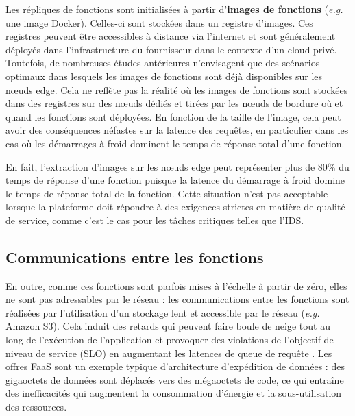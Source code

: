 Les répliques de fonctions sont initialisées à partir d'\textbf{images de fonctions} (\textit{e.g.} une image Docker). Celles-ci sont stockées dans un registre d'images. Ces registres peuvent être accessibles à distance via l'internet et sont généralement déployés dans l'infrastructure du fournisseur dans le contexte d'un cloud privé. Toutefois, de nombreuses études antérieures \cite{bhasiCypressInputSizesensitive2022, zijunFassflowEfficient2022, smithFaDOFaaSFunctions2022, zhangFIRSTExploitingMultiDimensional2023} n'envisagent que des scénarios optimaux dans lesquels les images de fonctions sont déjà disponibles sur les nœuds edge. Cela ne reflète pas la réalité où les images de fonctions sont stockées dans des registres sur des nœuds dédiés et tirées par les nœuds de bordure où et quand les fonctions sont déployées. En fonction de la taille de l'image, cela peut avoir des conséquences néfastes sur la latence des requêtes, en particulier dans les cas où les démarrages à froid dominent le temps de réponse total d'une fonction.

En fait, l'extraction d'images sur les nœuds edge peut représenter plus de 80\% du temps de réponse d'une fonction \cite{yanHermesEfficientCache2020} puisque la latence du démarrage à froid domine le temps de réponse total de la fonction. Cette situation n'est pas acceptable lorsque la plateforme doit répondre à des exigences strictes en matière de qualité de service, comme c'est le cas pour les tâches critiques telles que l'IDS.

\subsection{Communications entre les fonctions}
\label{section:herocache-background-communications}

En outre, comme ces fonctions sont parfois mises à l'échelle à partir de zéro, elles ne sont pas adressables par le réseau : les communications entre les fonctions sont réalisées par l'utilisation d'un stockage lent et accessible par le réseau (\textit{e.g.} Amazon S3). Cela induit des retards qui peuvent faire boule de neige tout au long de l'exécution de l'application et provoquer des violations de l'objectif de niveau de service (SLO) en augmentant les latences de queue de requête \cite{wawrzoniakBoxerDataAnalytics2021a}. Les offres FaaS sont un exemple typique d'architecture d'expédition de données : des gigaoctets de données sont déplacés vers des mégaoctets de code, ce qui entraîne des inefficacités qui augmentent la consommation d'énergie et la sous-utilisation des ressources.

